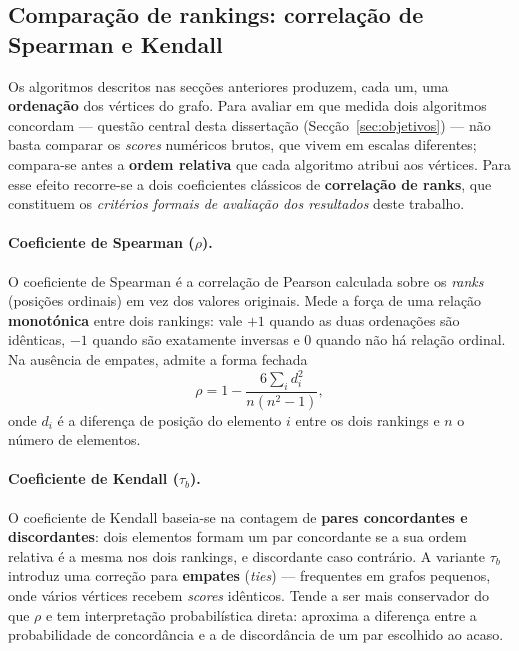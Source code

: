 \subsection{Comparação de rankings: correlação de Spearman e Kendall}
\label{sec:rank-correlation}

Os algoritmos descritos nas secções anteriores produzem, cada um, uma
\textbf{ordenação} dos vértices do grafo. Para avaliar em que medida
dois algoritmos concordam --- questão central desta dissertação
(Secção~\ref{sec:objetivos}) --- não basta comparar os \emph{scores}
numéricos brutos, que vivem em escalas diferentes; compara-se antes a
\textbf{ordem relativa} que cada algoritmo atribui aos vértices. Para
esse efeito recorre-se a dois coeficientes clássicos de
\textbf{correlação de ranks}, que constituem os \emph{critérios formais
de avaliação dos resultados} deste trabalho.

\paragraph{Coeficiente de Spearman ($\rho$).} O coeficiente de
Spearman \parencite{spearman1904} é a correlação de Pearson calculada
sobre os \emph{ranks} (posições ordinais) em vez dos valores
originais. Mede a força de uma relação \textbf{monotónica} entre dois
rankings: vale $+1$ quando as duas ordenações são idênticas, $-1$
quando são exatamente inversas e $0$ quando não há relação ordinal.
Na ausência de empates, admite a forma fechada
\[
    \rho = 1 - \frac{6 \sum_i d_i^2}{n(n^2 - 1)},
\]
onde $d_i$ é a diferença de posição do elemento $i$ entre os dois
rankings e $n$ o número de elementos.

\paragraph{Coeficiente de Kendall ($\tau_b$).} O coeficiente de
Kendall \parencite{kendall1938} baseia-se na contagem de
\textbf{pares concordantes e discordantes}: dois elementos formam um
par concordante se a sua ordem relativa é a mesma nos dois rankings, e
discordante caso contrário. A variante $\tau_b$
\parencite{goodman1954} introduz uma correção para \textbf{empates}
(\emph{ties}) --- frequentes em grafos pequenos, onde vários vértices
recebem \emph{scores} idênticos. Tende a ser mais conservador do que
$\rho$ e tem interpretação probabilística direta: aproxima a diferença
entre a probabilidade de concordância e a de discordância de um par
escolhido ao acaso.

